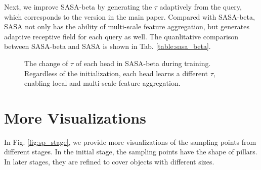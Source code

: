 \documentclass[10pt,twocolumn,letterpaper]{article}
\begin{document}
Next, we improve SASA-beta by generating the $\tau$ adaptively from the query, which corresponds to the version in the main paper. Compared with SASA-beta, SASA not only has the ability of multi-scale feature aggregation, but generates adaptive receptive field for each query as well. The quanlitative comparison between SASA-beta and SASA is shown in Tab. \ref{table:sasa_beta}.

\begin{figure}[t]
  \centering
  \hfill
  \vspace{-5pt}
  \caption{The change of $\tau$ of each head in SASA-beta during training. Regardless of the initialization, each head learns a different $\tau$, enabling local and multi-scale feature aggregation.}
  \label{fig:sasa_tau_training}
\end{figure}

\section{More Visualizations}

In Fig. \ref{fig:sp_stage}, we provide more visualizations of the sampling points from different stages. In the initial stage, the sampling points have the shape of pillars. In later stages, they are refined to cover objects with different sizes.

\begin{figure*}
  \centering

  \vspace{5pt}
  \vspace{5pt}
  \vspace{15pt}
  \vspace{5pt}
  \vspace{5pt}

  \caption{Visualized sampling points from different stages. Different instances are distinguished by colors.}
  \vspace{-5pt}
  \label{fig:sp_stage}
\end{figure*}
\end{document}
